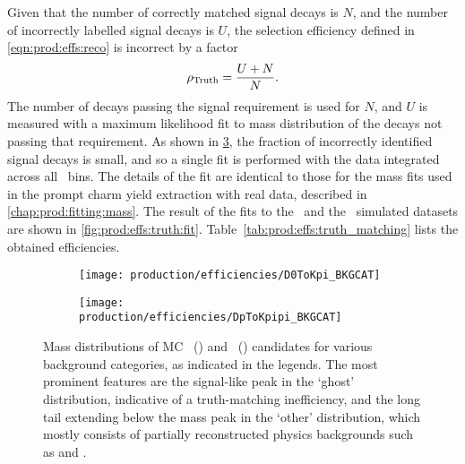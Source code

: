 Given that the number of correctly matched signal decays is $N$, and the number 
of incorrectly labelled signal decays is $U$, the selection efficiency defined 
in \cref{eqn:prod:effs:reco} is incorrect by a factor
\begin{equation}
  \rho_{\textnormal{Truth}} = \frac{U+N}{N}.
  \label{eqn:prod:effs:truth}
\end{equation}
The number of decays passing the signal requirement is used for $N$, and $U$ is 
measured with a maximum likelihood fit to mass distribution of the decays not 
passing that requirement.
As shown in \cref{fig:prod:effs:truth:categories}, the fraction of incorrectly 
identified signal decays is small, and so a single fit is performed with the 
data integrated across all \pTy\ bins.
The details of the fit are identical to those for the mass fits used in the 
prompt charm yield extraction with real data, described in 
\cref{chap:prod:fitting:mass}.
The result of the fits to the \DzToKpi\ and the \DpToKpipi\ simulated datasets 
are shown in \cref{fig:prod:effs:truth:fit}.
Table~\ref{tab:prod:effs:truth_matching} lists the obtained efficiencies.

\begin{figure}
  \begin{subfigure}[b]{0.5\textwidth}
    \centering
    \texttt{[image: production/efficiencies/D0ToKpi\_BKGCAT]}
    \caption{\PDzero}
    \label{fig:prod:effs:truth:categories:D0ToKpi}
  \end{subfigure}
  \begin{subfigure}[b]{0.5\textwidth}
    \centering
    \texttt{[image: production/efficiencies/DpToKpipi\_BKGCAT]}
    \caption{\PDplus}
    \label{fig:prod:effs:truth:categories:DpToKpipi}
  \end{subfigure}
  \caption{%
    Mass distributions of \ac{MC} 
    \PDzero~() and 
    \PDplus~() candidates for 
    various background categories, as indicated in the legends.
    The most prominent features are the signal-like peak in the `ghost' 
    distribution, indicative of a truth-matching inefficiency, and the long 
    tail extending below the mass peak in the `other' distribution, which 
    mostly consists of partially reconstructed physics backgrounds such as 
    \decay{\PDzero}{\PKminus\Ppiplus\Ppizero} and 
    \decay{\PDplus}{\PKminus\Ppiplus\Ppiplus\Ppizero}.
  }
  \label{fig:prod:effs:truth:categories}
\end{figure}

